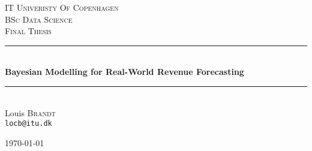 \begin{titlepage} %
	\newcommand{\HRule}{\rule{\linewidth}{0.5mm}} %
	
	\center %
	
	
	\textsc{\LARGE IT Univeristy Of Copenhagen}\\[1.5cm] %
	\textsc{\Large BSc Data Science}\\[0.5cm] %
	\textsc{\large Final Thesis}\\[0.5cm] %
	
	
	\HRule\\[0.4cm]
	{\huge\bfseries Bayesian Modelling for Real-World Revenue Forecasting}\\[0.4cm] %
	\HRule\\[1.5cm]
	
	Louis \textsc{Brandt} \\
	\texttt{locb@itu.dk}
	
	\vfill\vfill\vfill %
	{\large\today} %
	
	
	\vfill %
	
\end{titlepage}
